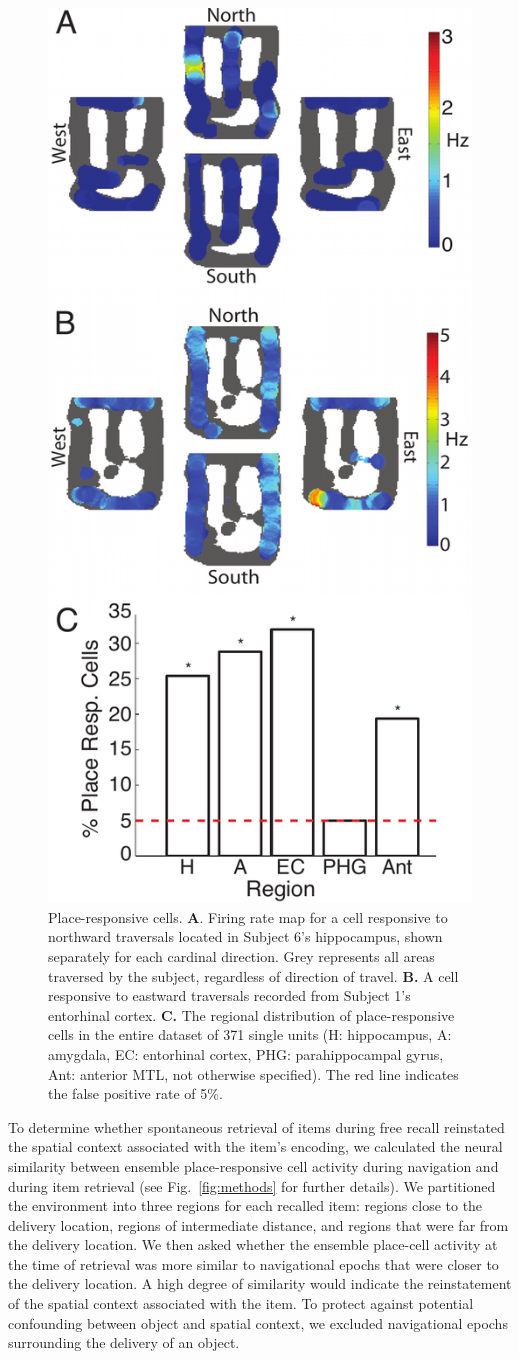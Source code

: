 \begin{figure}
\centering
    \includegraphics[width=.5\textwidth]{./tex/dboy/figs/fig2}
  \caption[Place-responsive cells]{Place-responsive cells.  \textbf{A}. Firing rate map for a cell responsive to northward traversals located in Subject 6's hippocampus, shown separately for each cardinal direction. Grey represents all areas traversed by the subject, regardless of direction of travel. \textbf{B.} A cell responsive to eastward traversals recorded from Subject 1's entorhinal cortex. \textbf{C.} The regional distribution of place-responsive cells in the entire dataset of 371 single units (H: hippocampus, A: amygdala, EC: entorhinal cortex, PHG: parahippocampal gyrus, Ant: anterior MTL, not otherwise specified).  The red line indicates the false positive rate of 5\%.}
\label{fig:place_ex}
\end{figure}

To determine whether spontaneous retrieval of items during free recall reinstated the spatial context associated with the item's encoding, we calculated the neural similarity between ensemble place-responsive cell activity during navigation and during item retrieval (see Fig.~\ref{fig:methods} for further details).  We partitioned the environment into three regions for each recalled item: regions close to the delivery location, regions of intermediate distance, and regions that were far from the delivery location.  We then asked whether the ensemble place-cell activity at the time of retrieval was more similar to navigational epochs that were closer to the delivery location.  A high degree of similarity would indicate the reinstatement of the spatial context associated with the item.  To protect against potential confounding between object and spatial context, we excluded navigational epochs surrounding the delivery of an object.  

